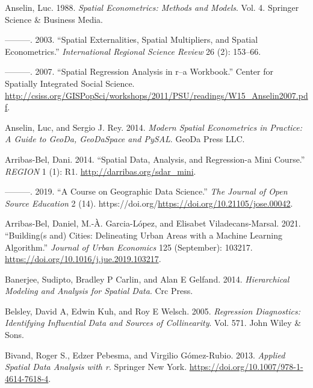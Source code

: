 \documentclass[
  letterpaper,
  krantz2]{style/krantz}
\newlength{\cslhangindent}
\newlength{\cslentryspacingunit} %
\newenvironment{CSLReferences}[2] %
 {%
  \setlength{\parindent}{0pt}
  \ifodd #1
  \let\oldpar\par
  \def\par{\hangindent=\cslhangindent\oldpar}
  \fi
  \setlength{\parskip}{#2\cslentryspacingunit}
 }%
 {}
\begin{document}
\hypertarget{refs}{}
\begin{CSLReferences}{1}{0}
\leavevmode{}%
Anselin, Luc. 1988. \emph{Spatial Econometrics: Methods and Models}.
Vol. 4. Springer Science \& Business Media.

\leavevmode{}%
---------. 2003. {``Spatial Externalities, Spatial Multipliers, and
Spatial Econometrics.''} \emph{International Regional Science Review} 26
(2): 153--66.

\leavevmode{}%
---------. 2007. {``Spatial Regression Analysis in r--a Workbook.''}
Center for Spatially Integrated Social Science.
\url{http://csiss.org/GISPopSci/workshops/2011/PSU/readings/W15_Anselin2007.pdf}.

\leavevmode{}%
Anselin, Luc, and Sergio J. Rey. 2014. \emph{Modern Spatial Econometrics
in Practice: A Guide to GeoDa, GeoDaSpace and PySAL}. GeoDa Press LLC.

\leavevmode{}%
Arribas-Bel, Dani. 2014. {``Spatial Data, Analysis, and Regression-a
Mini Course.''} \emph{REGION} 1 (1): R1.
\url{http://darribas.org/sdar_mini}.

\leavevmode{}%
---------. 2019. {``A Course on Geographic Data Science.''} \emph{The
Journal of Open Source Education} 2 (14).
https://doi.org/\url{https://doi.org/10.21105/jose.00042}.

\leavevmode{}%
Arribas-Bel, Daniel, M.-À. Garcia-López, and Elisabet Viladecans-Marsal.
2021. {``Building(s and) Cities: Delineating Urban Areas with a Machine
Learning Algorithm.''} \emph{Journal of Urban Economics} 125
(September): 103217. \url{https://doi.org/10.1016/j.jue.2019.103217}.

\leavevmode{}%
Banerjee, Sudipto, Bradley P Carlin, and Alan E Gelfand. 2014.
\emph{Hierarchical Modeling and Analysis for Spatial Data}. Crc Press.

\leavevmode{}%
Belsley, David A, Edwin Kuh, and Roy E Welsch. 2005. \emph{Regression
Diagnostics: Identifying Influential Data and Sources of Collinearity}.
Vol. 571. John Wiley \& Sons.

\leavevmode{}%
Bivand, Roger S., Edzer Pebesma, and Virgilio Gómez-Rubio. 2013.
\emph{Applied Spatial Data Analysis with r}. Springer New York.
\url{https://doi.org/10.1007/978-1-4614-7618-4}.


\end{CSLReferences}
\end{document}
